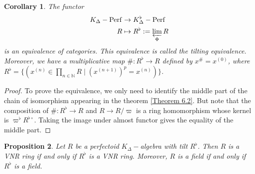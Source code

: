 \documentclass[12pts,a4paper]{amsart}
\newtheorem{proposition}{Proposition}[section]
\newtheorem{corollary}[proposition]{Corollary}
\DeclareMathOperator{\Perf}{Perf}
\begin{document}
\begin{corollary}
    The functor 
    \begin{align*}
        K_\Delta-\Perf&\to K^\flat_\Delta-\Perf\\
                    R &\mapsto R^\flat:=\varprojlim\limits_{\Phi} R
    \end{align*}
    is an equivalence of categories. This equivalence is called the \emph{tilting equivalence}. Moreover, we have a multiplicative map $\#: R^\flat\to R$ defined by $x^\#=x^{(0)}$, where $R^\flat=\Big\{(x^{(n)}\in \prod\limits_{n\in\mathbb{N}}R\mid (x^{(n+1)})^p=x^{(n)})\Big\}$.
\end{corollary}

\begin{proof}
    To prove the equivalence, we only need to identify the middle part of the chain of isomorphism appearing in the theorem \ref{Theorem 6.2}. But note that the composition of $\#:R^\flat\to R$ and $R\to R/\varpi$ is a ring homomorphism whose kernel is $\varpi^\flat R^{\flat\circ}$. Taking the image under almost functor gives the equality of the middle part.
\end{proof}

\begin{proposition}
    Let $R$ be a perfectoid $K_\Delta-$algebra with tilt $R^\flat$. Then $R$ is a VNR ring if and only if $R^\flat$ is a VNR ring. Moreover, $R$ is a field if and only if $R^\flat$ is a field.
\end{proposition}
\end{document}

